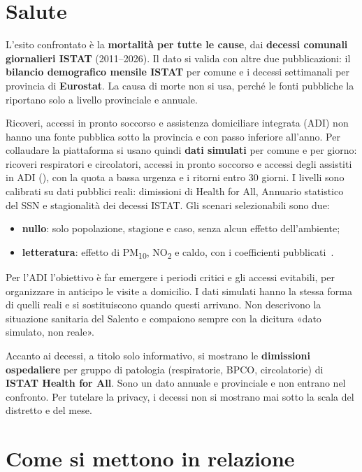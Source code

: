 \section{Salute}
\label{sec:domini-salute}

L'esito confrontato è la \textbf{mortalità per tutte le cause}, dai \textbf{decessi comunali giornalieri ISTAT} (2011--2026). Il dato si valida con altre due pubblicazioni: il \textbf{bilancio demografico mensile ISTAT} per comune e i decessi settimanali per provincia di \textbf{Eurostat}. La causa di morte non si usa, perché le fonti pubbliche la riportano solo a livello provinciale e annuale.

Ricoveri, accessi in pronto soccorso e assistenza domiciliare integrata (ADI) non hanno una fonte pubblica sotto la provincia e con passo inferiore all'anno. Per collaudare la piattaforma si usano quindi \textbf{dati simulati} per comune e per giorno: ricoveri respiratori e circolatori, accessi in pronto soccorso e accessi degli assistiti in ADI (), con la quota a bassa urgenza e i ritorni entro 30 giorni. I livelli sono calibrati su dati pubblici reali: dimissioni di Health for All, Annuario statistico del SSN e stagionalità dei decessi ISTAT. Gli scenari selezionabili sono due:
\begin{itemize}
  \item \textbf{nullo}: solo popolazione, stagione e caso, senza alcun effetto dell'ambiente;
  \item \textbf{letteratura}: effetto di PM\textsubscript{10}, NO\textsubscript{2} e caldo, con i coefficienti pubblicati~\cite{scarinzi_epiair2_2013,michelozzi_phewe_2009}.
\end{itemize}
Per l'ADI l'obiettivo è far emergere i periodi critici e gli accessi evitabili, per organizzare in anticipo le visite a domicilio. I dati simulati hanno la stessa forma di quelli reali e si sostituiscono quando questi arrivano. Non descrivono la situazione sanitaria del Salento e compaiono sempre con la dicitura «dato simulato, non reale».

Accanto ai decessi, a titolo solo informativo, si mostrano le \textbf{dimissioni ospedaliere} per gruppo di patologia (respiratorie, BPCO, circolatorie) di \textbf{ISTAT Health for All}. Sono un dato annuale e provinciale e non entrano nel confronto. Per tutelare la privacy, i decessi non si mostrano mai sotto la scala del distretto e del mese.

\section{Come si mettono in relazione}
\label{sec:domini-correlazione}

